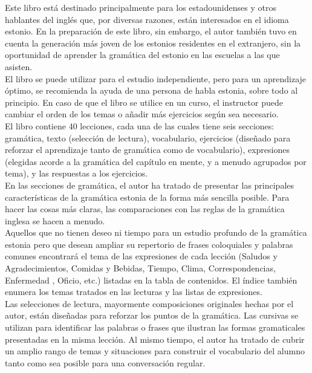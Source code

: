 Este libro está destinado principalmente para los estadounidenses y otros hablantes del inglés que, por diversas razones, están interesados en el idioma estonio. En la preparación de este libro, sin embargo, el autor también tuvo en cuenta la generación más joven de los estonios residentes en el extranjero, sin la oportunidad de aprender la gramática del estonio en las escuelas a las que asisten.\\

El libro se puede utilizar para el estudio independiente, pero para un aprendizaje óptimo, se recomienda la ayuda de una persona de habla estonia, sobre todo al principio. En caso de que el libro se utilice en un curso, el instructor puede cambiar el orden de los temas o añadir más ejercicios según sea necesario.\\

El libro contiene 40 lecciones, cada una de las cuales tiene seis secciones: gramática, texto (selección de lectura), vocabulario, ejercicios (diseñado para reforzar el aprendizaje tanto de gramática como de vocabulario), expresiones (elegidas acorde a la gramática del capítulo en mente, y a menudo agrupados por tema), y las respuestas a los ejercicios.\\

En las secciones de gramática, el autor ha tratado de presentar las principales características de la gramática estonia de la forma más sencilla posible. Para hacer las cosas más claras, las comparaciones con las reglas de la gramática inglesa se hacen a menudo.\\

Aquellos que no tienen deseo ni tiempo para un estudio profundo de la gramática estonia pero que desean ampliar su repertorio de frases coloquiales y palabras comunes encontrará el tema de las expresiones de cada lección (Saludos y Agradecimientos, Comidas y Bebidas, Tiempo, Clima, Correspondencias, Enfermedad , Oficio, etc.) listadas en la tabla de contenidos. El índice también enumera los temas tratados en las lecturas y las listas de expresiones.\\

Las selecciones de lectura, mayormente composiciones originales hechas por el autor, están diseñadas para reforzar los puntos de la gramática. Las cursivas se utilizan para identificar las palabras o frases que ilustran las formas gramaticales presentadas en la misma lección. Al mismo tiempo, el autor ha tratado de cubrir un amplio rango de temas y situaciones para construir el vocabulario del alumno tanto como sea posible para una conversación regular.\\

